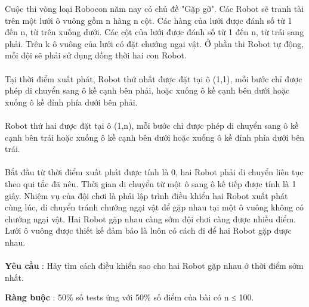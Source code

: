 Cuộc thi vòng loại Robocon năm nay có chủ đề "Gặp gỡ". Các Robot sẽ tranh tài trên một lưới ô vuông gồm n hàng n cột. Các hàng của lưới được đánh số từ 1 đến n, từ trên xuống dưới. Các cột của lưới được đánh số từ 1 đến n, từ trái sang phải. Trên k ô vuông của lưới có đặt chướng ngại vật. Ở phần thi Robot tự động, mỗi đội sẽ phải sử dụng đồng thời hai con Robot.
\\
\\Tại thời điểm xuất phát, Robot thứ nhất được đặt tại ô (1,1), mỗi bước chỉ được phép di chuyển sang ô kề cạnh bên phải, hoặc xuống ô kề cạnh bên dưới hoặc xuống ô kề đỉnh phía dưới bên phải.
\\
\\Robot thứ hai được đặt tại ô (1,n), mỗi bước chỉ được phép di chuyển sang ô kề cạnh bên trái hoặc xuống ô kề cạnh bên dưới hoặc xuống ô kề đỉnh phía dưới bên trái.
\\
\\Bắt đầu từ thời điểm xuất phát được tính là 0, hai Robot phải di chuyển liên tục theo qui tắc đã nêu. Thời gian di chuyển từ một ô sang ô kế tiếp được tính là 1 giây. Nhiệm vụ của đội chơi là phải lập trình điều khiển hai Robot xuất phát cùng lúc, di chuyển tránh chướng ngại vật để gặp nhau tại một ô vuông không có chướng ngại vật. Hai Robot gặp nhau càng sớm đội chơi càng được nhiều điểm. Lưới ô vuông được thiết kế đảm bảo là luôn có cách đi để hai Robot gặp được nhau.
\\
\\\textbf{Yêu cầu } : Hãy tìm cách điều khiển sao cho hai Robot gặp nhau ở thời điểm sớm nhất.

\textbf{Ràng buộc } : 50\% số tests ứng với 50\% số điểm của bài có n ≤ 100.